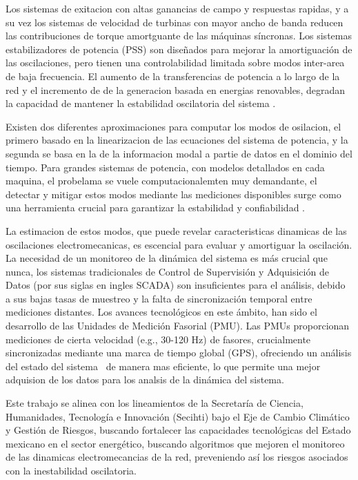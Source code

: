 Los sistemas de exitacion con altas ganancias de campo y respuestas rapidas, y a su vez los sistemas de velocidad 
de turbinas con mayor ancho de banda reducen las contribuciones de torque amortguante de las máquinas síncronas.
Los sistemas estabilizadores de potencia (PSS) son diseñados para mejorar la amortiguación de las oscilaciones,
pero tienen una controlabilidad limitada sobre modos inter-area de baja frecuencia. El aumento de la transferencias 
de potencia a lo largo de la red y el incremento de de la generacion basada en energias renovables, degradan la 
capacidad de mantener la estabilidad oscilatoria del sistema \cite{ieee2012}. 

Existen dos diferentes aproximaciones para computar los modos de osilacion, el primero basado en la 
linearizacion de las ecuaciones del sistema de potencia, y la segunda se basa en la de la informacion 
modal a partie de datos en el dominio del tiempo. Para grandes sistemas de potencia, con modelos detallados en 
cada maquina, el probelama se vuele computacionalemten muy demandante, el detectar y mitigar estos modos mediante 
las mediciones disponibles surge como una herramienta crucial para garantizar la estabilidad y confiabilidad 
\cite{ieee2012}. 

La estimacion de estos modos, que puede revelar caracteristicas dinamicas de las oscilaciones electromecanicas,
es escencial para evaluar y amortiguar la oscilación. La necesidad de un monitoreo de la dinámica del sistema 
es más crucial que nunca, los sistemas tradicionales de Control de Supervisión y Adquisición de Datos (por sus 
siglas en ingles SCADA) son insuficientes para el análisis, debido a sus bajas tasas de muestreo y la falta de 
sincronización temporal entre mediciones distantes. Los avances tecnológicos en este ámbito, han sido el desarrollo 
de las Unidades de Medición Fasorial (PMU). Las PMUs proporcionan mediciones de cierta velocidad (e.g., 30-120 Hz) de 
fasores, crucialmente sincronizadas mediante una marca de tiempo global (GPS), ofreciendo un análisis del estado del 
sistema~\cite{Hauer2007} de manera mas eficiente, lo que permite una mejor adquision de los datos para los analsis
de la dinámica del sistema.

Este trabajo se alinea con los lineamientos de la Secretaría de Ciencia, Humanidades, Tecnología e 
Innovación (Secihti) bajo el Eje de Cambio Climático y Gestión de Riesgos, buscando fortalecer las 
capacidades tecnológicas del Estado mexicano en el sector energético, buscando algoritmos que mejoren el monitoreo
de las dinamicas electromecancias de la red, preveniendo así los riesgos asociados con la inestabilidad oscilatoria.


